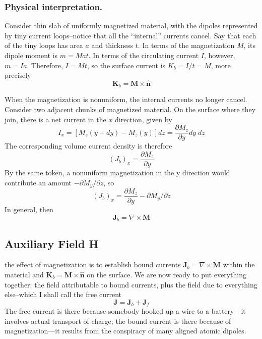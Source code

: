 \documentclass[../../../main.tex]{subfiles}
\begin{document}
\subsubsection{Physical interpretation.} Consider thin slab of uniformly magnetized material, with the dipoles represented by tiny current loops--notice that all the “internal” currents cancel. Say that each of the tiny loops has area $a$ and thickness $t$. In terms of the magnetization $M$, its dipole moment is $m = Mat$. In terms of the circulating current $I$, however, $m = I a$. Therefore, $I = Mt$, so the surface current is $K_b = I/t = M$, more precisely 
\begin{equation*}
    \mathbf{K}_b=\mathbf{M}\times \mathbf{\hat{n}}
\end{equation*}

When the magnetization is nonuniform, the internal currents no longer cancel. Consider two adjacent chunks of magnetized material. On the surface where they join, there is a net current in the $x$ direction, given by
\begin{equation*}
    I_x = [M_z(y + dy) - M_z(y)] dz=\frac{\partial M_z}{\partial y} dy\;dz
\end{equation*}
The corresponding volume current density is therefore
\begin{equation*}
    (J_b)_x =\frac{\partial M_z}{\partial y} 
\end{equation*}
By the same token, a nonuniform magnetization in the y direction would contribute an amount $-\partial M_y/\partial z$, so
\begin{equation*}
    (J_b)_x =\frac{\partial M_z}{\partial y} -\partial M_y/\partial z
\end{equation*}
In general, then
\begin{equation*}
    \mathbf{J}_b=\nabla \times \mathbf{M}
\end{equation*}

\subsection{Auxiliary Field H}
the effect of magnetization is to establish bound currents $ \mathbf{J}_b=\nabla \times \mathbf{M}$ within the material and $ \mathbf{K}_b=  \mathbf{M}\times\mathbf{\hat{n}}$ on the surface. We are now ready to put everything together: the ﬁeld attributable to bound currents, plus the ﬁeld due to everything else--which I shall call the free current
\begin{equation*}
    \mathbf{J}=\mathbf{J}_b+\mathbf{J}_f
\end{equation*}
The free current is there because somebody hooked up a wire to a battery—it involves actual transport of charge; the bound current is there because of magnetization—it results from the conspiracy of many aligned atomic dipoles.
\end{document}
